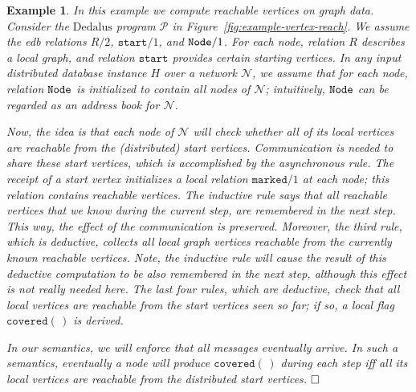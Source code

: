 \documentclass{tlp}
\newtheorem{example}[theorem]{Example}
\newcommand{\qed}{\hfill $\square$}
\newcommand{\langname}[1]{\text{#1}}  \newcommand{\pred}[1]{\mathtt{#1}}  \newcommand{\fname}[1]{\mathit{#1}}  \newcommand{\sq}[1]{`{#1}'}
\newcommand{\dedalus}{\langname{Dedalus}}
\renewcommand{\qed}{$\hfill \square$}  \newcommand{\tline}{\hrulefill}
\newcommand{\ded}{\mathcal{P}}
\newcommand{\rar}[2]{#1/#2}
\newcommand{\ntup}{(\,)}
\newcommand{\nw}{\mathcal{N}}
\begin{document}
\begin{example}
    \label{ex:cover}
    In this example we compute reachable vertices on graph data.
    Consider the $\dedalus$ program $\ded$ in Figure~\ref{fig:example-vertex-reach}.
    We assume the \emph{edb} relations $\rar R2$, $\rar{\pred{start}}1$,
    and $\rar{\relnode}1$. For each node, relation $R$ describes a local
    graph, and relation $\pred{start}$ provides certain starting vertices.
    In any input distributed database instance $H$ over a network $\nw$, we assume that for each node, relation $\relnode$ is initialized
    to contain all nodes of $\nw$; intuitively, $\relnode$ can be regarded
    as an address book for $\nw$.

    Now, the idea is that each node of $\nw$ will check whether all of
    its local vertices are reachable from the (distributed) start vertices.
    Communication is needed to share these start vertices, which is accomplished
    by the asynchronous rule. The receipt of a start vertex initializes
    a local relation $\rar{\pred{marked}}1$ at each node; this relation
    contains reachable vertices. The inductive rule says that all reachable
    vertices that we know during the current step, are remembered in the
    next step. This way, the effect of the communication is preserved.
    Moreover, the third rule, which is deductive, collects all local graph
    vertices reachable from the currently known reachable vertices. Note,
    the inductive rule will cause the result of this deductive computation
    to be also remembered in the next step, although this effect is not
    really needed here. The last four rules, which are deductive, check
    that all local vertices are reachable from the start vertices seen
    so far; if so, a local flag $\pred{covered}\ntup$ is derived. 

    In our semantics, we will enforce that all messages eventually arrive.
    In such a semantics, eventually a node will produce $\pred{covered}\ntup$
    during each step iff all its local vertices are reachable from the
    distributed start vertices.
    \qed
\end{example}
\end{document}
